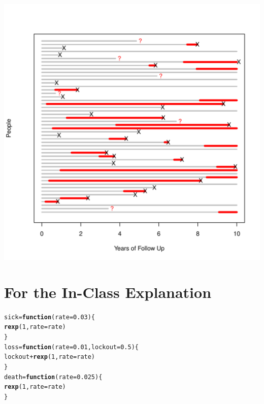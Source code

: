 \documentclass{article}\usepackage{graphicx, color}
\makeatletter
\newcommand{\hlfunctioncall}[1]{\textcolor[rgb]{0.501960784313725,0,0.329411764705882}{\textbf{#1}}}%
\newenvironment{kframe}{%
 \def\at@end@of@kframe{}%
 \ifinner\ifhmode%
  \def\at@end@of@kframe{\end{minipage}}%
  \begin{minipage}{\columnwidth}%
 \fi\fi%
 \def\FrameCommand##1{\hskip\@totalleftmargin \hskip-\fboxsep
 \colorbox{shadecolor}{##1}\hskip-\fboxsep
     \hskip-\linewidth \hskip-\@totalleftmargin \hskip\columnwidth}%
 \MakeFramed {\advance\hsize-\width
   \@totalleftmargin\z@ \linewidth\hsize
   \@setminipage}}%
 {\par\unskip\endMakeFramed%
 \at@end@of@kframe}
\newenvironment{knitrout}{}{} %
\makeatother
\begin{document}
\begin{knitrout}
\color{fgcolor}\includegraphics[width=6in]{figure/ten} 
\end{knitrout}


\section{For the In-Class Explanation}
\begin{knitrout}
\color{fgcolor}\begin{kframe}
\begin{alltt}
sick = \hlfunctioncall{function}(rate = 0.03) \{
    \hlfunctioncall{rexp}(1, rate = rate)
\}
loss = \hlfunctioncall{function}(rate = 0.01, lockout = 0.5) \{
    lockout + \hlfunctioncall{rexp}(1, rate = rate)
\}
death = \hlfunctioncall{function}(rate = 0.025) \{
    \hlfunctioncall{rexp}(1, rate = rate)
\}
\end{alltt}
\end{kframe}
\end{knitrout}
\end{document}
